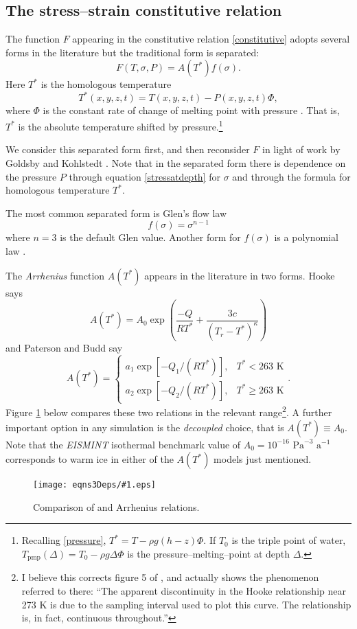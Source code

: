 \documentclass[12pt,final]{amsart}%
\theoremstyle{plain}
\theoremstyle{definition}
\theoremstyle{remark}
\newcommand{\regfigure}[2]{\texttt{[image: eqns3Deps/\#1.eps]}}
\newcommand{\Tpmp}{T_{\text{pmp}}}
\begin{document}
\subsection*{The stress--strain constitutive relation}\label{Fsubsect}  The function $F$ appearing in the constitutive relation \eqref{constitutive} adopts several forms in the literature but the traditional form is separated:
\begin{equation}\label{tradF}
F(T,\sigma,P)=A(T^*) f(\sigma).
\end{equation}
Here $T^*$ is the homologous temperature
    $$T^*(x,y,z,t) = T(x,y,z,t) - P(x,y,z,t) \Phi,$$
where $\Phi$ is the constant rate of change of melting point with pressure \citep{PayneBaldwin}.  That is, $T^*$ is the absolute temperature shifted by pressure.\footnote{Recalling \eqref{pressure}, $T^*=T-\rho g (h-z) \Phi$.  If $T_0$ is the triple point of water, $\Tpmp(\Delta) = T_0 - \rho g \Delta \Phi$ is the pressure--melting--point at depth $\Delta$.}

We consider this separated form first, and then reconsider $F$ in light of work by Goldsby and Kohlstedt \citep{GoldsbyKohlstedt}.  Note that in the separated form there is dependence on the pressure $P$ through equation \eqref{stressatdepth} for $\sigma$ and through the formula for homologous temperature $T^*$.

The most common separated form is Glen's flow law \citep{Glen}
    $$f(\sigma)=\sigma^{n-1}$$
where $n=3$ is the default Glen value.  Another form for $f(\sigma)$ is a polynomial law \citep{Hutter93}.

The \emph{Arrhenius} function $A(T^*)$ appears in the literature in two forms.  Hooke \citep{Hooke} says
    $$A(T^*) = A_0 \exp\left(\frac{-Q}{R T^*} + \frac{3c}{(T_r - T^*)^\kappa}\right)$$
and Paterson and Budd \citep{PatersonBudd} say
\begin{equation}\label{PatBuddArr}
A(T^*) = \begin{cases} a_1 \exp\left[-Q_1/(R T^*)\right], &T^*<263 \text{ K} \\
a_2 \exp\left[-Q_2/(R T^*)\right], &T^*\ge 263 \text{ K} \end{cases}.
\end{equation}
Figure \ref{arrfig} below compares these two relations in the relevant range\footnote{I believe this corrects figure 5 of \citep{PayneBaldwin}, and actually shows the phenomenon referred to there: ``The apparent discontinuity in the Hooke relationship near 273 K is due to the sampling interval used to plot this curve.  The relationship is, in fact, continuous throughout.''}.  A further important option in any simulation is the \emph{decoupled} choice, that is $A(T^*)\equiv A_0$.  Note that the \emph{EISMINT} isothermal benchmark \citep{EISMINT96} value of $A_0=10^{-16}$ $\text{Pa}^{-3}$ $\text{a}^{-1}$ corresponds to warm ice in either of the $A(T^*)$ models just mentioned.
\begin{figure}[ht]
\regfigure{arrfig}{3}
\caption{Comparison of \citet{Hooke} and \citet{PatersonBudd} Arrhenius relations.}
\label{arrfig}
\end{figure}
\end{document}
